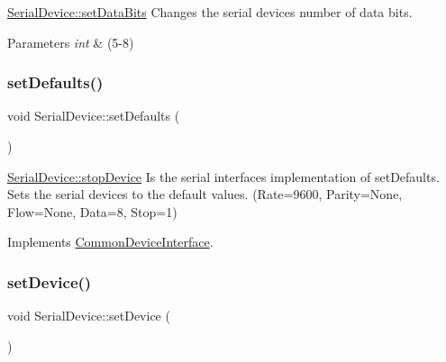 \hyperlink{class_serial_device_ad0ddca3e77e1d1d4df7c68e83f1ecd91}{Serial\+Device\+::set\+Data\+Bits} Changes the serial device\textquotesingle{}s number of data bits. 


\begin{DoxyParams}{Parameters}
{\em int} & (5-\/8) \\
\hline
\end{DoxyParams}
\hypertarget{class_serial_device_a08a8a19f8a25c1dc7593c91afc7d55bd}{}\label{class_serial_device_a08a8a19f8a25c1dc7593c91afc7d55bd} 
\subsubsection{\texorpdfstring{set\+Defaults()}{setDefaults()}}
{\footnotesize\ttfamily void Serial\+Device\+::set\+Defaults (\begin{DoxyParamCaption}{ }\end{DoxyParamCaption})\hspace{0.3cm}{\ttfamily [virtual]}}



\hyperlink{class_serial_device_a55f94898f33ab4674c138fa2cb2e75a1}{Serial\+Device\+::stop\+Device} Is the serial interface\textquotesingle{}s implementation of set\+Defaults. Sets the serial devices to the default values. (Rate=9600, Parity=None, Flow=None, Data=8, Stop=1) 



Implements \hyperlink{class_common_device_interface_a542621a8b9e023531cae26447b2f8447}{Common\+Device\+Interface}.

\hypertarget{class_serial_device_a38f5d9bc555bb1df0a4c8413e494d4b3}{}\label{class_serial_device_a38f5d9bc555bb1df0a4c8413e494d4b3} 
\subsubsection{\texorpdfstring{set\+Device()}{setDevice()}}
{\footnotesize\ttfamily void Serial\+Device\+::set\+Device (\begin{DoxyParamCaption}\item[{int}]{ }\end{DoxyParamCaption})}

\hypertarget{class_serial_device_a74968289347c6ede64587287bb0cf699}{}\label{class_serial_device_a74968289347c6ede64587287bb0cf699} 
